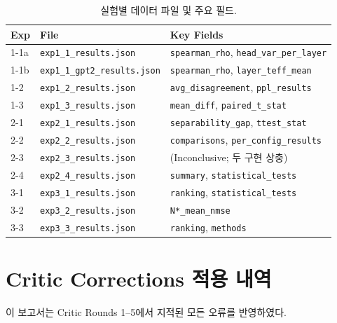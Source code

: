\documentclass[11pt,a4paper]{article}
\begin{document}
\begin{table}[H]
\centering
\caption{실험별 데이터 파일 및 주요 필드.}
\label{tab:datasource}
\small
\begin{tabularx}{\textwidth}{lXl}
\toprule
\textbf{Exp} & \textbf{File} & \textbf{Key Fields} \\
\midrule
1-1a & \texttt{exp1\_1\_results.json} & \texttt{spearman\_rho}, \texttt{head\_var\_per\_layer} \\
1-1b & \texttt{exp1\_1\_gpt2\_results.json} & \texttt{spearman\_rho}, \texttt{layer\_teff\_mean} \\
1-2 & \texttt{exp1\_2\_results.json} & \texttt{avg\_disagreement}, \texttt{ppl\_results} \\
1-3 & \texttt{exp1\_3\_results.json} & \texttt{mean\_diff}, \texttt{paired\_t\_stat} \\
2-1 & \texttt{exp2\_1\_results.json} & \texttt{separability\_gap}, \texttt{ttest\_stat} \\
2-2 & \texttt{exp2\_2\_results.json} & \texttt{comparisons}, \texttt{per\_config\_results} \\
2-3 & \texttt{exp2\_3\_results.json} & (Inconclusive; 두 구현 상충) \\
2-4 & \texttt{exp2\_4\_results.json} & \texttt{summary}, \texttt{statistical\_tests} \\
3-1 & \texttt{exp3\_1\_results.json} & \texttt{ranking}, \texttt{statistical\_tests} \\
3-2 & \texttt{exp3\_2\_results.json} & \texttt{N*\_mean\_nmse} \\
3-3 & \texttt{exp3\_3\_results.json} & \texttt{ranking}, \texttt{methods} \\
\bottomrule
\end{tabularx}
\end{table}

\section{Critic Corrections 적용 내역}

이 보고서는 Critic Rounds 1--5에서 지적된 모든 오류를 반영하였다.
\end{document}
